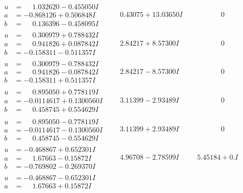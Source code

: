 \documentclass[1p]{elsarticle_modified}
\theoremstyle{definition}
\begin{document}
$$\begin{array}{c|c|c}
\begin{aligned}
u &= \phantom{-}1.032620 - 0.455050 I \\
a &= -0.868126 + 0.506848 I \\
b &= \phantom{-}0.136396 - 0.458095 I\end{aligned}
 & \phantom{-}0.43075 + 13.03650 I & \phantom{-0.000000 } 0 \\ \hline\begin{aligned}
u &= \phantom{-}0.300979 + 0.788432 I \\
a &= \phantom{-}0.941826 + 0.087842 I \\
b &= -0.158311 - 0.511357 I\end{aligned}
 & \phantom{-}2.84217 + 8.57300 I & \phantom{-0.000000 } 0 \\ \hline\begin{aligned}
u &= \phantom{-}0.300979 - 0.788432 I \\
a &= \phantom{-}0.941826 - 0.087842 I \\
b &= -0.158311 + 0.511357 I\end{aligned}
 & \phantom{-}2.84217 - 8.57300 I & \phantom{-0.000000 } 0 \\ \hline\begin{aligned}
u &= \phantom{-}0.895050 + 0.778119 I \\
a &= -0.0114617 + 0.1300560 I \\
b &= \phantom{-}0.458745 + 0.554629 I\end{aligned}
 & \phantom{-}3.11399 - 2.93489 I & \phantom{-0.000000 } 0 \\ \hline\begin{aligned}
u &= \phantom{-}0.895050 - 0.778119 I \\
a &= -0.0114617 - 0.1300560 I \\
b &= \phantom{-}0.458745 - 0.554629 I\end{aligned}
 & \phantom{-}3.11399 + 2.93489 I & \phantom{-0.000000 } 0 \\ \hline\begin{aligned}
u &= -0.468867 + 0.652301 I \\
a &= \phantom{-}1.67663 - 0.15872 I \\
b &= -0.769802 - 0.269370 I\end{aligned}
 & \phantom{-}4.96708 - 2.78599 I & \phantom{-}5.45184 + 0. I\phantom{ +0.000000I} \\ \hline\begin{aligned}
u &= -0.468867 - 0.652301 I \\
a &= \phantom{-}1.67663 + 0.15872 I \\

\end{aligned}
\end{array}$$
\end{document}
